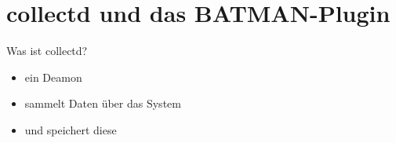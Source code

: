 \documentclass[ngerman,compress,aspectratio=169]{beamer}
\begin{document}
\section{collectd und das BATMAN-Plugin}

\begin{frame}{Was ist collectd?}
	\begin{itemize}
		\pause
		\item ein Deamon
		\pause
		\item sammelt Daten \"uber das System
		\pause
		\item und speichert diese
	\end{itemize}
\end{frame}
\end{document}
